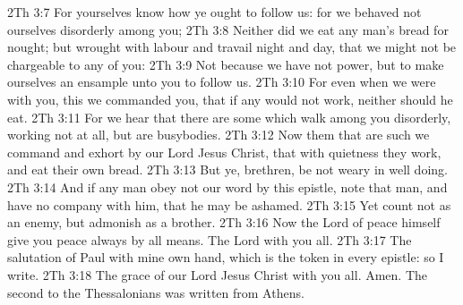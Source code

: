 \vs 2Th 3:7 For yourselves know how ye ought to follow us: for we behaved not ourselves disorderly among you;
\vs 2Th 3:8 Neither did we eat any man's bread for nought; but wrought with labour and travail night and day, that we might not be chargeable to any of you:
\vs 2Th 3:9 Not because we have not power, but to make ourselves an ensample unto you to follow us.
\vs 2Th 3:10 For even when we were with you, this we commanded you, that if any would not work, neither should he eat.
\vs 2Th 3:11 For we hear that there are some which walk among you disorderly, working not at all, but are busybodies.
\vs 2Th 3:12 Now them that are such we command and exhort by our Lord Jesus Christ, that with quietness they work, and eat their own bread.
\vs 2Th 3:13 But ye, brethren, be not weary in well doing.
\vs 2Th 3:14 And if any man obey not our word by this epistle, note that man, and have no company with him, that he may be ashamed.
\vs 2Th 3:15 Yet count  not as an enemy, but admonish  as a brother.
\vs 2Th 3:16 Now the Lord of peace himself give you peace always by all means. The Lord  with you all.
\vs 2Th 3:17 The salutation of Paul with mine own hand, which is the token in every epistle: so I write.
\vs 2Th 3:18 The grace of our Lord Jesus Christ  with you all. Amen. The second  to the Thessalonians was written from Athens.
